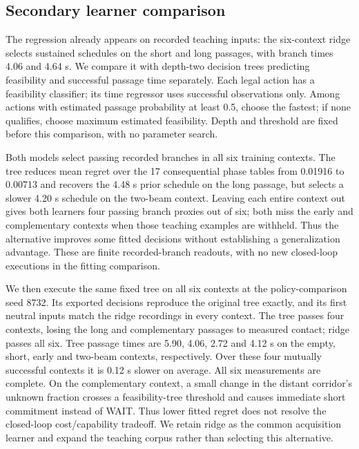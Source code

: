 \subsection{Secondary learner comparison}
\label{app:learner_debug}
The regression already appears on recorded teaching inputs: the six-context
ridge selects sustained schedules on the short and long passages, with branch
times 4.06 and 4.64 s. We compare it with depth-two decision trees predicting
feasibility and successful passage time separately. Each legal action has a
feasibility classifier; its time regressor uses successful observations only.
Among actions with estimated passage probability at least 0.5, choose the
fastest; if none qualifies, choose maximum estimated feasibility. Depth and
threshold are fixed before this comparison, with no parameter search.

Both models select passing recorded branches in all six training contexts. The
tree reduces mean regret over the 17 consequential phase tables from 0.01916 to
0.00713 and recovers the 4.48 s prior schedule on the long passage, but selects a
slower 4.20 s schedule on the two-beam context. Leaving each entire context out
gives both learners four passing branch proxies out of six; both miss the early
and complementary contexts when those teaching examples are withheld.
Thus the alternative improves some fitted decisions without establishing a
generalization advantage. These are finite recorded-branch readouts, with no new
closed-loop executions in the fitting comparison.

We then execute the same fixed tree on all six contexts at the policy-comparison
seed 8732. Its exported decisions reproduce the original tree exactly, and its
first neutral inputs match the ridge recordings in every context. The tree passes
four contexts, losing the long and complementary passages to measured contact;
ridge passes all six. Tree passage times are 5.90, 4.06, 2.72 and 4.12 s on the
empty, short, early and two-beam contexts, respectively. Over these four mutually
successful contexts it is 0.12 s slower on average. All six measurements are
complete. On the complementary context, a small change in the distant corridor's
unknown fraction crosses a feasibility-tree threshold and causes immediate short
commitment instead of WAIT. Thus lower fitted regret does not resolve the
closed-loop cost/capability tradeoff. We retain ridge as the common acquisition
learner and expand the teaching corpus rather than selecting this alternative.

